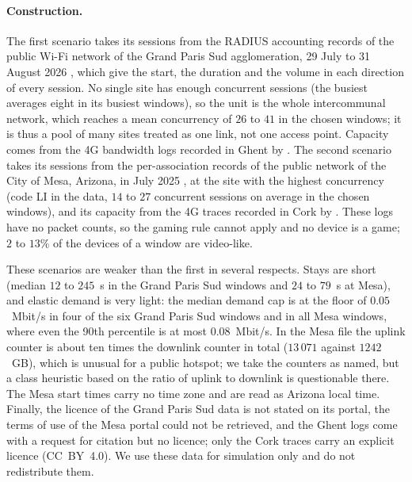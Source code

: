 \documentclass[preprint,11pt]{elsarticle}
\theoremstyle{definition}
\theoremstyle{remark}
\begin{document}
\paragraph{Construction.}
The first scenario takes its sessions from the RADIUS accounting records of the public Wi-Fi network of the Grand Paris Sud agglomeration, 29 July to 31 August 2026 \citep{grandparissud2026wifi}, which give the start, the duration and the volume in each direction of every session.
No single site has enough concurrent sessions (the busiest averages eight in its busiest windows), so the unit is the whole intercommunal network, which reaches a mean concurrency of $26$ to $41$ in the chosen windows; it is thus a pool of many sites treated as one link, not one access point.
Capacity comes from the 4G bandwidth logs recorded in Ghent by \citet{vanderhooft2016http2}.
The second scenario takes its sessions from the per-association records of the public network of the City of Mesa, Arizona, in July 2025 \citep{mesa2026wifi}, at the site with the highest concurrency (code LI in the data, $14$ to $27$ concurrent sessions on average in the chosen windows), and its capacity from the 4G traces recorded in Cork by \citet{raca2018beyond4g}.
These logs have no packet counts, so the gaming rule cannot apply and no device is a game; $2$ to $13\%$ of the devices of a window are video-like.

These scenarios are weaker than the first in several respects.
Stays are short (median $12$ to $245$~s in the Grand Paris Sud windows and $24$ to $79$~s at Mesa), and elastic demand is very light: the median demand cap is at the floor of $0.05$~Mbit/s in four of the six Grand Paris Sud windows and in all Mesa windows, where even the 90th percentile is at most $0.08$~Mbit/s.
In the Mesa file the uplink counter is about ten times the downlink counter in total ($13\,071$ against $1242$~GB), which is unusual for a public hotspot; we take the counters as named, but a class heuristic based on the ratio of uplink to downlink is questionable there.
The Mesa start times carry no time zone and are read as Arizona local time.
Finally, the licence of the Grand Paris Sud data is not stated on its portal, the terms of use of the Mesa portal could not be retrieved, and the Ghent logs come with a request for citation but no licence; only the Cork traces carry an explicit licence (CC~BY~4.0). We use these data for simulation only and do not redistribute them.
\end{document}
